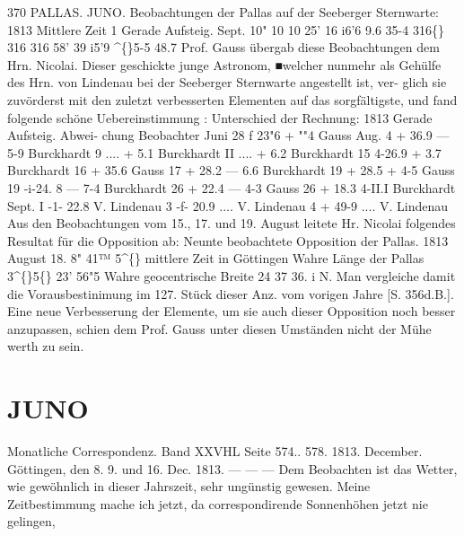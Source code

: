 \documentclass[12pt,a4paper]{article}
\newcommand{\degree}{\textdegree}
\begin{document}
\newpage
370 
PALLAS.    JUNO. 
Beobachtungen  der  Pallas  auf  der  Seeberger  Sternwarte: 
1813  Mittlere  Zeit    1  Gerade  Aufsteig. 
Sept. 
10" 
10 
10 
25' 
16 
i6'6 
9.6 
35-4 
316\degree\{\} 
316 
316 
58' 
39 
i5'9 
\textasciicircum\{\}5-5 
48.7 
Prof.  Gauss  übergab  diese  Beobachtungen  dem  Hrn.  Nicolai.  Dieser  geschickte  junge  Astronom, 
■welcher  nunmehr  als  Gehülfe  des  Hrn.  von  Lindenau  bei  der  Seeberger  Sternwarte  angestellt  ist,  ver- 
glich sie  zuvörderst  mit  den  zuletzt  verbesserten  Elementen  auf  das  sorgfältigste,  und  fand  folgende 
schöne  Uebereinstimmung : 
Unterschied  der  Rechnung: 
1813 
Gerade 
Aufsteig. 
Abwei- 
chung 
Beobachter 
Juni     28 
f  23"6 
+  ""4 
Gauss 
Aug.      4 
+  36.9 
---    5-9 
Burckhardt 
9 
.... 
+    5.1 
Burckhardt 
II 
.... 
+    6.2 
Burckhardt 
15 
4-26.9 
+    3.7 
Burckhardt 
16 
+  35.6 
Gauss 
17 
+  28.2 
---    6.6 
Burckhardt 
19 
+  28.5 
+    4-5 
Gauss 
19 
-i-24.  8 
---    7-4 
Burckhardt 
26 
+  22.4 
---    4-3 
Gauss 
26 
+  18.3 
4-II.I 
Burckhardt 
Sept.     I 
-1-  22.8 
V.  Lindenau 
3 
-f-  20.9 
.... 
V.  Lindenau 
4 
+  49-9 
.... 
V.  Lindenau 
Aus  den  Beobachtungen  vom  15.,  17.  und   19.  August  leitete  Hr.  Nicolai  folgendes  Resultat  für 
die  Opposition  ab: 
Neunte  beobachtete   Opposition  der  Pallas. 
1813  August  18.     8"  41™  5\textasciicircum\{\}  mittlere  Zeit  in  Göttingen 
Wahre  Länge  der  Pallas   
3\textasciicircum\{\}5\degree\{\}  23'    56"5 
Wahre  geocentrische  Breite   
24    37     36.  i  N. 
Man  vergleiche  damit  die  Vorausbestinimung  im  127.  Stück  dieser  Anz.  vom  vorigen  Jahre  [S.  356d.B.]. 
Eine  neue  Verbesserung  der  Elemente,  um   sie    auch  dieser  Opposition  noch  besser  anzupassen, 
schien  dem  Prof.  Gauss  unter  diesen  Umständen  nicht  der  Mühe  werth  zu  sein. 

\section*{JUNO}
Monatliche  Correspondenz.     Band  XXVHL  Seite  574.. 578.     1813.  December. 
Göttingen,  den  8.  9.  und  16.  Dec.  1813. 
---  ---  ---  Dem  Beobachten  ist  das  Wetter,    wie    gewöhnlich  in  dieser  Jahrszeit,   sehr  ungünstig 
gewesen.    Meine  Zeitbestimmung  mache  ich  jetzt,  da  correspondirende  Sonnenhöhen  jetzt  nie  gelingen, 


\newpage
\end{document}
